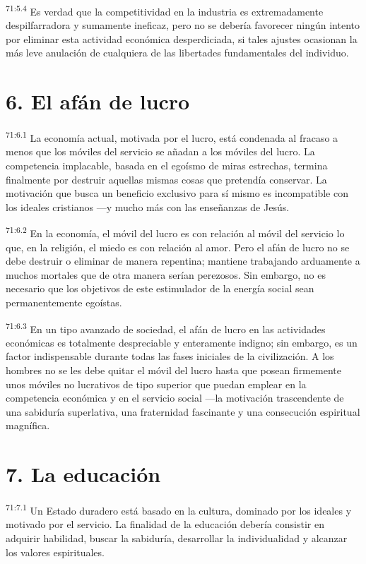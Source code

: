 \documentclass[twoside, 11pt]{book}
\begin{document}
\par
\textsuperscript{71:5.4} Es verdad que la competitividad en la industria es extremadamente despilfarradora y sumamente ineficaz, pero no se debería favorecer ningún intento por eliminar esta actividad económica desperdiciada, si tales ajustes ocasionan la más leve anulación de cualquiera de las libertades fundamentales del individuo.

\section*{6. El afán de lucro}
\par
\textsuperscript{71:6.1} La economía actual, motivada por el lucro, está condenada al fracaso a menos que los móviles del servicio se añadan a los móviles del lucro. La competencia implacable, basada en el egoísmo de miras estrechas, termina finalmente por destruir aquellas mismas cosas que pretendía conservar. La motivación que busca un beneficio exclusivo para sí mismo es incompatible con los ideales cristianos ---y mucho más con las enseñanzas de Jesús.

\par
\textsuperscript{71:6.2} En la economía, el móvil del lucro es con relación al móvil del servicio lo que, en la religión, el miedo es con relación al amor. Pero el afán de lucro no se debe destruir o eliminar de manera repentina; mantiene trabajando arduamente a muchos mortales que de otra manera serían perezosos. Sin embargo, no es necesario que los objetivos de este estimulador de la energía social sean permanentemente egoístas.

\par
\textsuperscript{71:6.3} En un tipo avanzado de sociedad, el afán de lucro en las actividades económicas es totalmente despreciable y enteramente indigno; sin embargo, es un factor indispensable durante todas las fases iniciales de la civilización. A los hombres no se les debe quitar el móvil del lucro hasta que posean firmemente unos móviles no lucrativos de tipo superior que puedan emplear en la competencia económica y en el servicio social ---la motivación trascendente de una sabiduría superlativa, una fraternidad fascinante y una consecución espiritual magnífica.

\section*{7. La educación}
\par
\textsuperscript{71:7.1} Un Estado duradero está basado en la cultura, dominado por los ideales y motivado por el servicio. La finalidad de la educación debería consistir en adquirir habilidad, buscar la sabiduría, desarrollar la individualidad y alcanzar los valores espirituales.
\end{document}

